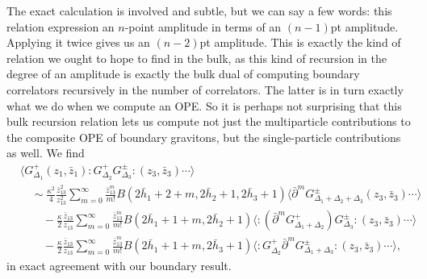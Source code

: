 \documentclass[11pt,letterpaper]{article}
\newcommand{\LP}{\left(}
\newcommand{\RP}{\right)}
\newcommand{\D}{\partial}
\begin{document}
The exact calculation is involved and subtle, but we can say a few words: this relation expression an $n$-point amplitude in terms of an $(n-1)$pt amplitude. Applying it twice gives us an $(n-2)$pt amplitude. This is exactly the kind of relation we ought to hope to find in the bulk, as this kind of recursion in the degree of an amplitude is exactly the bulk dual of computing boundary correlators recursively in the number of correlators. The latter is in turn exactly what we do when we compute an OPE. So it is perhaps not surprising that this bulk recursion relation lets us compute not just the multiparticle contributions to the composite OPE of boundary gravitons, but the single-particle contributions as well. We find  \begin{equation}
     \begin{split}
         & \langle G^+_{\Delta_1}(z_1, \bar{z}_1) : G^+_{\Delta_2}G^\pm_{\Delta_3}:(z_3, \bar{z}_3) \cdots\rangle \\
         & \quad \sim \frac{\kappa^2}{4} \frac{\bar{z}_{13}^2}{z_{13}^2}\sum_{m=0}^\infty \frac{\bar{z}_{13}^{m}}{m!}   B(2 \bar{h}_1 + 2 + m, 2 \bar{h}_2 + 1, 2 \bar{h}_3 + 1) \langle \bar{\partial}^m G^\pm_{\Delta_1+\Delta_2+\Delta_3} (z_3, \bar{z}_3) \cdots \rangle\\
         &\quad \quad - \frac{\kappa}{2} \frac{\bar{z}_{13}}{z_{13}}\sum_{m=0}^\infty \frac{\bar{z}^{m}_{13}}{m!}  B(2 \bar{h}_1+1 + m, 2 \bar{h}_2 + 1) \langle  :\LP \bar{\D}^m G^{+} _{\Delta_1 + \Delta_2} \RP G_{\Delta_3}^{\pm }: (z_3, \bar{z}_3)\cdots \rangle \\
         & \quad \quad - \frac{\kappa}{2} \frac{\bar{z}_{13}}{z_{13}}\sum_{m=0}^\infty \frac{\bar{z}^{m}_{13}}{m!}B(2 \bar{h}_1 + 1 + m, 2 \bar{h}_3 + 1) \langle  :G_{\Delta_2}^{+} \bar{\D}^m G^{\pm}_{\Delta_1 + \Delta_3} :(z_3, \bar{z}_3)\cdots \rangle,
     \end{split}
\end{equation}
in exact agreement with our boundary result.
\end{document}
